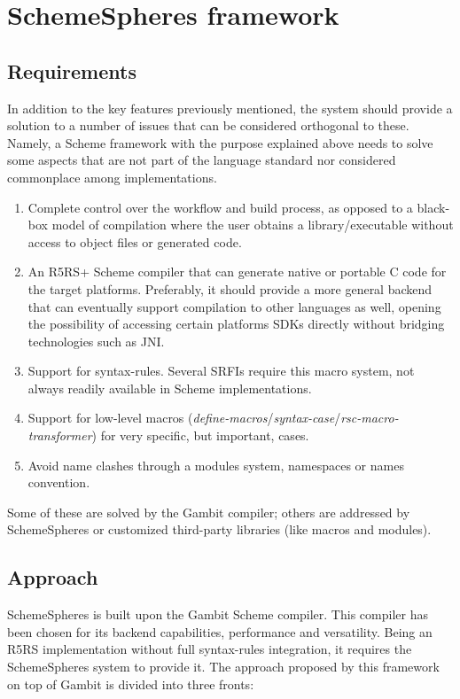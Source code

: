 \documentclass{acm_proc_article-sp}
\begin{document}
\section{SchemeSpheres framework}

\subsection{Requirements}

In addition to the key features previously mentioned, the system should provide a solution to a number of issues that can be considered orthogonal to these. Namely, a Scheme framework with the purpose explained above needs to solve some aspects that are not part of the language standard nor considered commonplace among implementations.

\begin{enumerate}
  \item Complete control over the workflow and build process, as opposed to a black-box model of compilation where the user obtains a library/executable without access to object files or generated code.
  \item An R5RS+ Scheme compiler that can generate native or portable C code for the target platforms. Preferably, it should provide a more general backend that can eventually support compilation to other languages as well, opening the possibility of accessing certain platforms SDKs directly without bridging technologies such as JNI.
  \item Support for syntax-rules. Several SRFIs require this macro system, not always readily available in Scheme implementations.
  \item Support for low-level macros (\textit{define-macros}/\textit{syntax-case}/\textit{rsc-macro-transformer}) for very specific, but important, cases.
  \item Avoid name clashes through a modules system, namespaces or names convention.
\end{enumerate}

Some of these are solved by the Gambit compiler; others are addressed by SchemeSpheres or customized third-party libraries (like macros and modules).

\subsection{Approach}

SchemeSpheres is built upon the Gambit Scheme compiler. This compiler has been chosen for its backend capabilities, performance and versatility. Being an R5RS implementation without full syntax-rules integration, it requires the SchemeSpheres system to provide it. The approach proposed by this framework on top of Gambit is divided into three fronts:
\end{document}
